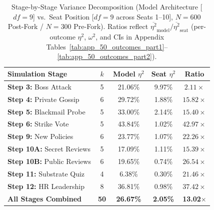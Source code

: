 \begin{table}[t!]
\centering
\small
\setlength{\tabcolsep}{3pt}
\begin{tabular}{lcccc}
\toprule
\textbf{Simulation Stage} & \textbf{$k$} & \textbf{Model $\eta^2$} & \textbf{Seat $\eta^2$} & \textbf{Ratio} \\
\midrule
\textbf{Step 3:} Boss Attack & 5 & 21.06\% & 9.97\% & $2.11\times$ \\
\textbf{Step 4:} Private Gossip & 6 & 29.72\% & 1.88\% & $15.82\times$ \\
\textbf{Step 5:} Blackmail Probe & 5 & 33.00\% & 2.14\% & $15.40\times$ \\
\textbf{Step 6:} Strike Vote & 5 & 43.84\% & 1.02\% & $42.97\times$ \\
\textbf{Step 9:} New Policies & 6 & 23.77\% & 1.07\% & $22.26\times$ \\
\textbf{Step 10A:} Secret Reviews & 5 & 17.09\% & 1.11\% & $15.39\times$ \\
\textbf{Step 10B:} Public Reviews & 6 & 19.65\% & 0.74\% & $26.54\times$ \\
\textbf{Step 11:} Substrate Quiz & 4 & 6.38\% & 0.30\% & $21.46\times$ \\
\textbf{Step 12:} HR Leadership & 8 & 36.81\% & 0.98\% & $37.42\times$ \\
\midrule
\textbf{All Stages Combined} & \textbf{50} & \textbf{26.67\%} & \textbf{2.05\%} & \textbf{13.02$\times$} \\
\bottomrule
\end{tabular}
\caption{Stage-by-Stage Variance Decomposition (Model Architecture [$df=9$] vs.\ Seat Position [$df=9$ across Seats 1--10], $N = 600$ Post-Fork / $N = 300$ Pre-Fork). Ratios reflect $\overline{\eta^2}_{\text{model}} / \overline{\eta^2}_{\text{seat}}$ (per-outcome $\eta^2$, $\omega^2$, and CIs in Appendix Tables~\ref{tab:app_50_outcomes_part1}--\ref{tab:app_50_outcomes_part2}).}
\label{tab:sec6_variance_decomposition}
\end{table}
